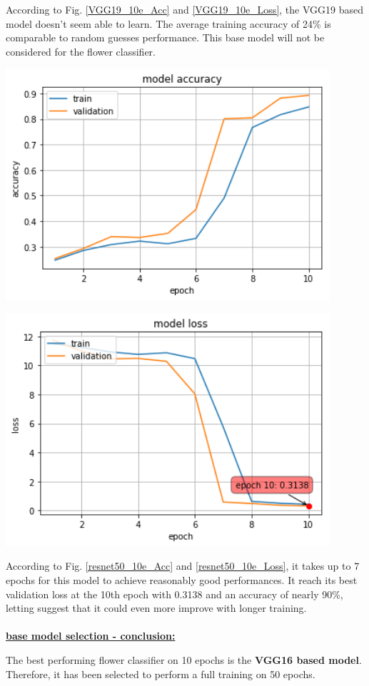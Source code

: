 According to Fig. \ref{VGG19_10e_Acc} and \ref{VGG19_10e_Loss}, the VGG19 based model doesn't seem able to learn. The average training accuracy of 24\% is comparable to random guesses performance. This base model will not be considered for the flower classifier.

\begin{center}
	\centering
	\begin{minipage}{0.5\textwidth}
		\centering
		\includegraphics[width=0.9\textwidth]{./sections/03_methodology/Resnet50_10epochs_acc.png}
		\label{resnet50_10e_Acc}
	\end{minipage}\hfill
	\begin{minipage}{0.5\textwidth}
		\centering
		\includegraphics[width=0.9\textwidth]{./sections/03_methodology/Resnet50_10epochs_loss.png} 
		\label{resnet50_10e_Loss}
	\end{minipage}
\end{center}

According to Fig. \ref{resnet50_10e_Acc} and \ref{resnet50_10e_Loss}, it takes up to 7 epochs for this model to achieve reasonably good performances. It reach its best validation loss at the 10th epoch with 0.3138 and an accuracy of nearly 90\%, letting suggest that it could even more improve with longer training. 
\\\\
\textbf{\underline{base model selection - conclusion:}}

The best performing flower classifier on 10 epochs is the \textbf{VGG16 based model}. Therefore, it has been selected to perform a full training on 50 epochs.
